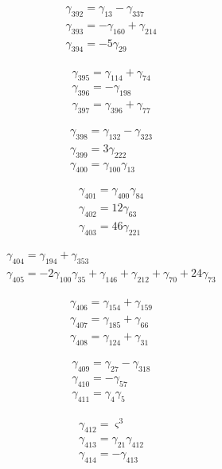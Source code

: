 \[\begin{aligned}\gamma_{392}=\gamma_{13} - \gamma_{337}\\ \gamma_{393}=- \gamma_{160} + \gamma_{214}\\ \gamma_{394}=- 5 \gamma_{29}\end{aligned}\]

\[\begin{aligned}\gamma_{395}=\gamma_{114} + \gamma_{74}\\ \gamma_{396}=- \gamma_{198}\\ \gamma_{397}=\gamma_{396} + \gamma_{77}\end{aligned}\]

\[\begin{aligned}\gamma_{398}=\gamma_{132} - \gamma_{323}\\ \gamma_{399}=3 \gamma_{222}\\ \gamma_{400}=\gamma_{100} \gamma_{13}\end{aligned}\]

\[\begin{aligned}\gamma_{401}=\gamma_{400} \gamma_{84}\\ \gamma_{402}=12 \gamma_{63}\\ \gamma_{403}=46 \gamma_{221}\end{aligned}\]

\[\begin{aligned}\gamma_{404}=\gamma_{194} + \gamma_{353}\\ \gamma_{405}=- 2 \gamma_{100} \gamma_{35} + \gamma_{146} + \gamma_{212} + \gamma_{70} + 24 \gamma_{73}\end{aligned}\]

\[\begin{aligned}\gamma_{406}=\gamma_{154} + \gamma_{159}\\ \gamma_{407}=\gamma_{185} + \gamma_{66}\\ \gamma_{408}=\gamma_{124} + \gamma_{31}\end{aligned}\]

\[\begin{aligned}\gamma_{409}=\gamma_{27} - \gamma_{318}\\ \gamma_{410}=- \gamma_{57}\\ \gamma_{411}=\gamma_{4} \gamma_{5}\end{aligned}\]

\[\begin{aligned}\gamma_{412}=\varsigma ^{3}\\ \gamma_{413}=\gamma_{21} \gamma_{412}\\ \gamma_{414}=- \gamma_{413}\end{aligned}\]

